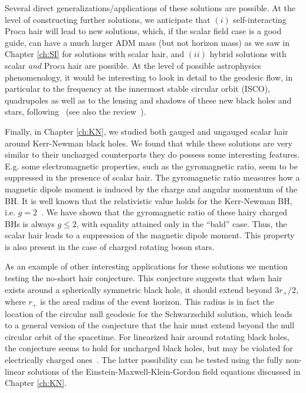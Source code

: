 Several direct generalizations/applications of these solutions are possible. 
At the level of constructing further 
solutions, we anticipate that 
$(i)$ self-interacting Proca hair will lead to new solutions, 
which, if the scalar field case is a good guide, can have a much larger ADM mass (but not horizon mass) as we saw in Chapter \ref{ch:SI} for solutions with scalar hair,
and
$(ii)$ hybrid solutions with scalar \emph{and} Proca hair are possible. 
At the level of possible astrophysics phenomenology, 
it would be interesting to look in detail to the geodesic flow, 
in particular to the frequency at the innermost stable circular orbit (ISCO), 
quadrupoles as well as to the lensing and shadows of these new black holes and stars,
following~\cite{Cunha:2015yba} (see also the review~\cite{Johannsen:2015mdd}). 

\bigskip

Finally, in Chapter \ref{ch:KN}, we studied both gauged and ungauged scalar hair around Kerr-Newman black holes.
We found that while these solutions are very similar to their uncharged counterparts they do possess some interesting features.
E.g. some electromagnetic properties, such as the gyromagnetic ratio, seem to be suppressed in the presence of scalar hair.
The gyromagnetic ratio measures how a magnetic dipole moment is induced by the charge and angular momentum of the BH.
It is well known that the relativistic value holds for the Kerr-Newman BH, i.e. $g=2$~\cite{Carter:1968rr}.
We have shown that the gyromagnetic ratio of these hairy charged BHs is always $g\leqslant 2$, with equality attained only in the ``bald'' case.
Thus, the scalar hair leads to a suppression of the magnetic dipole moment.
This property is also present in the case of charged rotating boson stars.

As an example of other interesting applications for these solutions we mention testing the no-short hair conjecture.
This conjecture suggests that when hair exists around a spherically symmetric black hole, it should extend beyond $3r_+/2$, where $r_+$ is the areal radius of the event horizon\cite{Nunez:1996xv}.
This radius is in fact the location of the circular null geodesic for the Schwarzschild solution, which leads to a general version of the conjecture that the hair must extend beyond the null circular orbit of the spacetime\cite{Hod:2011aa}.
For linearized hair around rotating black holes, the conjecture seems to hold for uncharged black holes\cite{Hod:2016dkn}, but may be violated for electrically charged ones~\cite{Hod:2014sha,Hod:2015ynd}.
The latter possibility can be tested using the fully non-linear solutions of the Einstein-Maxwell-Klein-Gordon field equations discussed in Chapter \ref{ch:KN}.

